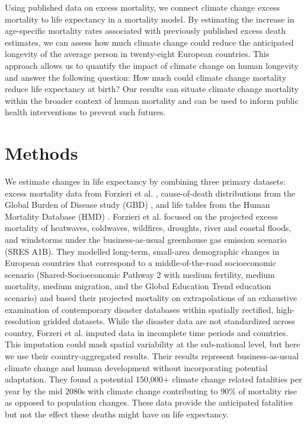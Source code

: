 \documentclass[12pt,]{article}
\begin{document}
Using published data on excess mortality, we connect climate change
excess mortality to life expectancy in a mortality model. By estimating
the increase in age-specific mortality rates associated with previously
published excess death estimates, we can assess how much climate change
could reduce the anticipated longevity of the average person in
twenty-eight European countries. This approach allows us to quantify the
impact of climate change on human longevity and answer the following
question: How much could climate change mortality reduce life expectancy
at birth? Our results can situate climate change mortality within the
broader context of human mortality and can be used to inform public
health interventions to prevent such futures.

\section{Methods}\label{methods}

We estimate changes in life expectancy by combining three primary
datasets: excess mortality data from Forzieri et al.
\citep{forzieri2017increasing}, cause-of-death distributions from the
Global Burden of Disease study (GBD) \citep{GBD, wang2012age}, and life
tables from the Human Mortality Database (HMD) \citep{HMD}. Forzieri et
al. \citep{forzieri2017increasing} focused on the projected excess
mortality of heatwaves, coldwaves, wildfires, droughts, river and
coastal floods, and windstorms under the business-as-usual greenhouse
gas emission scenario (SRES A1B). They modelled long-term, small-area
demographic changes in European countries that correspond to a
middle-of-the-road socioeconomic scenario (Shared-Socioeconomic Pathway
2 with medium fertility, medium mortality, medium migration, and the
Global Education Trend education scenario) and based their projected
mortality on extrapolations of an exhaustive examination of contemporary
disaster databases within spatially rectified, high-resolution gridded
datasets. While the disaster data are not standardized across country,
Forzeri et al. imputed data in incomplete time periods and countries.
This imputation could mask spatial variability at the sub-national
level, but here we use their country-aggregated results. Their results
represent business-as-usual climate change and human development without
incorporating potential adaptation. They found a potential 150,000+
climate change related fatalities per year by the mid 2080s with climate
change contributing to 90\% of mortality rise as opposed to population
changes. These data provide the anticipated fatalities but not the
effect these deaths might have on life expectancy.
\end{document}
